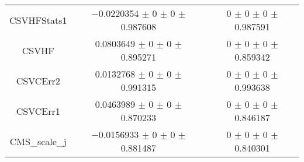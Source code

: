 \begin{table}
\begin{tabular}{ccc}
CSVHFStats1 & \num{-0.0220354} $\pm$ \num{0} $\pm$ \num{0} $\pm$ \num{0.987608} & \num{0} $\pm$ \num{0} $\pm$ \num{0} $\pm$ \num{0.987591}\\
CSVHF & \num{0.0803649} $\pm$ \num{0} $\pm$ \num{0} $\pm$ \num{0.895271} & \num{0} $\pm$ \num{0} $\pm$ \num{0} $\pm$ \num{0.859342}\\
CSVCErr2 & \num{0.0132768} $\pm$ \num{0} $\pm$ \num{0} $\pm$ \num{0.991315} & \num{0} $\pm$ \num{0} $\pm$ \num{0} $\pm$ \num{0.993638}\\
CSVCErr1 & \num{0.0463989} $\pm$ \num{0} $\pm$ \num{0} $\pm$ \num{0.870233} & \num{0} $\pm$ \num{0} $\pm$ \num{0} $\pm$ \num{0.846187}\\
CMS\_scale\_j & \num{-0.0156933} $\pm$ \num{0} $\pm$ \num{0} $\pm$ \num{0.881487} & \num{0} $\pm$ \num{0} $\pm$ \num{0} $\pm$ \num{0.840301}\\
\bottomrule
\end{tabular}
\end{table}